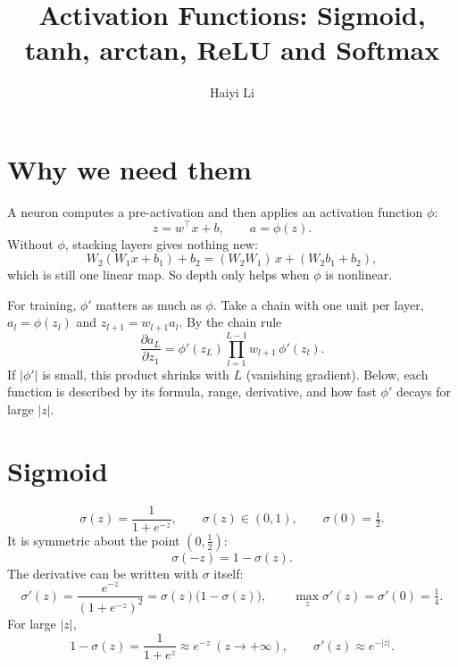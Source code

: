 \documentclass[11pt]{article}
\title{Activation Functions: Sigmoid, tanh, arctan, ReLU and Softmax}
\author{Haiyi Li}
\date{}
\begin{document}
\maketitle

\section{Why we need them}

A neuron computes a pre-activation and then applies an activation function $\phi$:
\begin{equation}
  z = w^\top x + b, \qquad a = \phi(z).
\end{equation}
Without $\phi$, stacking layers gives nothing new:
\begin{equation}
  W_2(W_1x+b_1)+b_2 = (W_2W_1)\,x + (W_2b_1+b_2),
\end{equation}
which is still one linear map. So depth only helps when $\phi$ is nonlinear.

For training, $\phi'$ matters as much as $\phi$. Take a chain with one unit per layer,
$a_l=\phi(z_l)$ and $z_{l+1}=w_{l+1}a_l$. By the chain rule
\begin{equation}
  \frac{\partial a_L}{\partial z_1}
  = \phi'(z_L)\prod_{l=1}^{L-1} w_{l+1}\,\phi'(z_l).
  \label{eq:chain}
\end{equation}
If $|\phi'|$ is small, this product shrinks with $L$ (vanishing gradient).
Below, each function is described by its formula, range, derivative,
and how fast $\phi'$ decays for large $|z|$.

\section{Sigmoid}

\begin{equation}
  \sigma(z)=\frac{1}{1+e^{-z}}, \qquad \sigma(z)\in(0,1), \qquad \sigma(0)=\tfrac12 .
\end{equation}
It is symmetric about the point $(0,\tfrac12)$:
\begin{equation}
  \sigma(-z)=1-\sigma(z).
\end{equation}
The derivative can be written with $\sigma$ itself:
\begin{equation}
  \sigma'(z)=\frac{e^{-z}}{(1+e^{-z})^2}=\sigma(z)\bigl(1-\sigma(z)\bigr),
  \qquad \max_z \sigma'(z)=\sigma'(0)=\tfrac14 .
  \label{eq:sigmoid-derivative}
\end{equation}
For large $|z|$,
\begin{equation}
  1-\sigma(z)=\frac{1}{1+e^{z}}\approx e^{-z}\ (z\to+\infty),
  \qquad \sigma'(z)\approx e^{-|z|}.
\end{equation}
\end{document}

